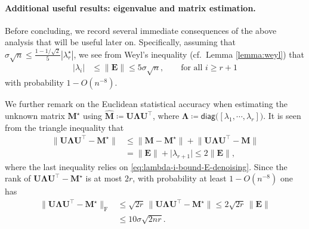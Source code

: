
\paragraph{Additional useful results: eigenvalue and matrix estimation.}
	Before concluding, we record several immediate consequences of the above analysis that will be useful later on. Specifically, assuming that $ \sigma \sqrt{n} \leq \frac{1-1/\sqrt{2}}{5} |\lambda_r^{\star}|$, we see from Weyl's inequality (cf.~Lemma \ref{lemma:weyl}) that
	\begin{align}
		|\lambda_{i}| & \leq\|\bm{E}\|\leq5\sigma\sqrt{n},
		\qquad
		\text{for all }i\geq r+1
		\label{eq:lambda-i-bound-E-denoising}
	\end{align}
with probability $1-O(n^{-8})$.

We further remark on the Euclidean statistical accuracy when estimating the unknown matrix $\bm{M}^{\star}$ using $\widehat{\bm{M}} \coloneqq \bm{U}\bm{\Lambda}\bm{U}^{\top}$, where $\bm{\Lambda} \coloneqq \mathsf{diag}\big([\lambda_{1},\cdots,\lambda_{r}]\big)$.
It is seen from the triangle inequality that
%
\begin{align}
\big\|\bm{U}\bm{\Lambda}\bm{U}^{\top}-\bm{M}^{\star}\big\| & \leq\big\|\bm{M}-\bm{M}^{\star}\big\|+\big\|\bm{U}\bm{\Lambda}\bm{U}^{\top}-\bm{M}\big\|\nonumber \\
 & =\big\|\bm{E}\big\|+\big|\lambda_{r+1}\big|\leq2\big\|\bm{E}\big\|,
	\label{eq:ULambdaU-Mstar-norm-denoising}
\end{align}
%
where the last inequality relies on \eqref{eq:lambda-i-bound-E-denoising}.
Since the rank of $\bm{U}\bm{\Lambda}\bm{U}^{\top}-\bm{M}^{\star}$ is at most $2r$,
with probability at least $1-O(n^{-8})$ one has
%
\begin{align}
	\big\|\bm{U}\bm{\Lambda}\bm{U}^{\top}-\bm{M}^{\star}\big\|_{\mathrm{F}}
	& \leq\sqrt{2r} \, \big\|\bm{U}\bm{\Lambda}\bm{U}^{\top}-\bm{M}^{\star}\big\|  \leq 2\sqrt{2r}\, \|\bm{E}\| \nonumber \\
	& \leq 10 \sigma\sqrt{2nr}.
	\label{eq:top-r-approx-Fro-bound}
\end{align}


